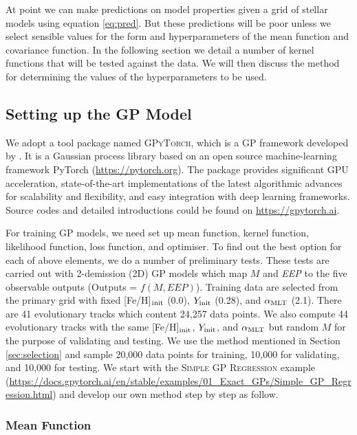 At point we can make predictions on model properties given a grid of stellar models using equation \ref{eq:pred}.  But these predictions will be poor unless we select sensible values for the form and hyperparameters of the mean function and covariance function.  In the following section we detail a number of kernel functions that will be tested against the data.  We will then discuss the method for determining the values of the hyperparameters to be used.


\subsection{Setting up the GP Model}\label{sec:set_up}

We adopt a tool package named \textsc{GPyTorch}, which is a GP framework developed by \citet{gardner2018gpytorch}. It is a Gaussian process library based on an open source machine-learning framework PyTorch (\url{https://pytorch.org}). The package provides significant GPU acceleration, state-of-the-art implementations of the latest algorithmic advances for scalability and flexibility, and easy integration with deep learning frameworks. Source codes and detailed introductions could be found on \url{https://gpytorch.ai}.

For training GP models, we need set up mean function, kernel function, likelihood function, loss function, and optimiser. 
To find out the best option for each of above elements, we do a number of preliminary tests. 
These tests are carried out with 2-demission (2D) GP models which map $M$ and {\it EEP} to the five observable outputs (Outputs = $f(M, EEP)$). Training data are selected from the primary grid with fixed [Fe/H]$_{\rm init}$ (0.0), $Y_{\rm init}$ (0.28), and $\alpha_{\rm MLT}$ (2.1). There are 41 evolutionary tracks which content 24,257 data points. We also compute 44 evolutionary tracks with the same [Fe/H]$_{\rm init}$, $Y_{\rm init}$, and $\alpha_{\rm MLT}$ but random $M$ for the purpose of validating and testing. We use the method mentioned in Section \ref{sec:selection} and sample 20,000 data points for training, 10,000 for validating, and 10,000 for testing. 
%
We start with the \textsc{Simple GP Regression} example (\url{https://docs.gpytorch.ai/en/stable/examples/01_Exact_GPs/Simple_GP_Regression.html}) and develop our own method step by step as follow. 

\subsubsection{Mean Function}

